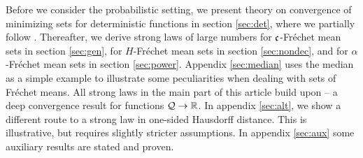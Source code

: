 Before we consider the probabilistic setting, we present theory on convergence of minimizing sets for deterministic functions in section \ref{sec:det}, where we partially follow \cite{rockafellar98}. Thereafter, we derive strong laws of large numbers for $\mathfrak{c}$-Fréchet mean sets in section \ref{sec:gen}, for $H$-Fréchet mean sets in section \ref{sec:nondec}, and for $\alpha$-Fréchet mean sets in section \ref{sec:power}. 
Appendix \ref{sec:median} uses the median as a simple example to illustrate some peculiarities when dealing with sets of Fréchet means.
All strong laws in the main part of this article build upon \cite[Theorem 8.2]{korf01} -- a deep convergence result for functions $\mathcal{Q} \to \mathbb{R}$. In appendix \ref{sec:alt}, we show a different route to a strong law in one-sided Hausdorff distance. This is illustrative, but requires slightly stricter assumptions. 
In appendix \ref{sec:aux} some auxiliary results are stated and proven.
%
